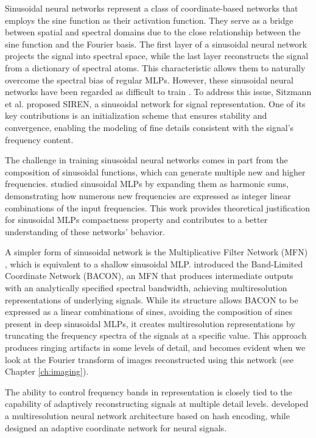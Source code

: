 Sinusoidal neural networks represent a class of coordinate-based networks that employs the sine function as their activation function. They serve as a bridge between spatial and spectral domains due to the close relationship between the sine function and the Fourier basis. The first layer of a sinusoidal neural network projects the signal into spectral space, while the last layer reconstructs the signal from a dictionary of spectral atoms. This characteristic allows them to naturally overcome the spectral bias of regular MLPs. However, these sinusoidal neural networks have been regarded as difficult to train \cite{taming2017}. To address this issue, Sitzmann et al. \cite{sitzmann2019siren} proposed SIREN, a sinusoidal network for signal representation. One of its key contributions is an initialization scheme that ensures stability and convergence, enabling the modeling of fine details consistent with the signal’s frequency content.

The challenge in training sinusoidal neural networks comes in part from the composition of sinusoidal functions, which can generate multiple new and higher frequencies. \cite{novello2022understanding} studied sinusoidal MLPs by expanding them as harmonic sums, demonstrating how numerous new frequencies are expressed as integer linear combinations of the input frequencies. This work provides theoretical justification for sinusoidal MLPs compactness property and contributes to a better understanding of these networks’ behavior.

A simpler form of sinusoidal network is the Multiplicative Filter Network (MFN) \cite{fathony2020multiplicative}, which is equivalent to a shallow sinusoidal MLP. \cite{bacon2021} introduced the Band-Limited Coordinate Network (BACON), an MFN that produces intermediate outputs with an analytically specified spectral bandwidth, achieving multiresolution representations of underlying signals. While its structure allows BACON to be expressed as a linear combinations of sines, avoiding the composition of sines present in deep sinusoidal MLPs, it creates multiresolution representations by truncating the frequency spectra of the signals at a specific value. This approach produces ringing artifacts in some levels of detail, and becomes evident when we look at the Fourier transform of images reconstructed using this network (see Chapter \ref{ch:imaging}).

The ability to control frequency bands in representation is closely tied to the capability of adaptively reconstructing signals at multiple detail levels. \citet{mueller2022instant} developed a multiresolution neural network architecture based on hash encoding, while \citet{martel2021acorn} designed an adaptive coordinate network for neural signals.

